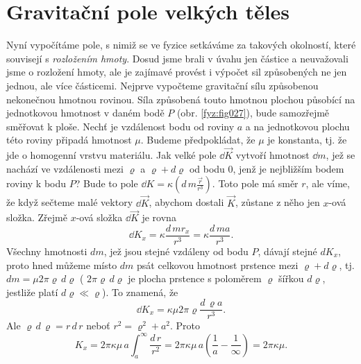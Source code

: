 {   
  \section{Gravitační pole velkých těles}
    Nyní vypočítáme pole, s nimiž se ve fyzice setkáváme za takových okolností, které souvisejí s 
    \emph{rozložením hmoty}. Dosud jsme brali v úvahu jen částice a neuvažovali jsme o rozložení 
    hmoty, ale je zajímavé provést i výpočet sil způsobených ne jen jednou, ale více částicemi. 
    Nejprve vypočteme gravitační sílu způsobenou nekonečnou hmotnou rovinou. Síla způsobená touto 
    hmotnou plochou působící na jednotkovou hmotnost v daném bodě \(P\) (obr. \ref{fyz:fig027}), 
    bude samozřejmě směřovat k ploše. Nechť je vzdálenost bodu od roviny \(a\) a na jednotkovou 
    plochu této roviny připadá hmotnost \(\mu\). Budeme předpokládat, že \(\mu\) je konstanta, tj. 
    že jde o homogenní vrstvu materiálu. Jak velké pole \(\dd{\vec{K}}\) vytvoří hmotnost 
    \(\dd{m}\), jež se nachází ve vzdálenosti mezi \(\varrho\) a \(\varrho +d\varrho\) od bodu 
    \(0\), jenž je nejbližším bodem roviny k bodu \(P\)? Bude to pole \(\dd{K} = 
    \kappa(d\,m\frac{\vec{r}}{r^3})\). Toto pole má směr \(r\), ale víme, že když sečteme malé 
    vektory \(\dd{\vec{K}}\), abychom dostali \(\vec{K}\), zůstane z něho jen \(x\)-ová složka. 
    Zřejmě \(x\)-ová složka \(\dd{\vec{K}}\) je rovna
    \begin{equation}\label{FYZ:eq046}
      \dd{K_x} = \kappa\frac{d\,mr_x}{r^3} = \kappa\frac{d\,ma}{r^3}.
    \end{equation}
    Všechny hmotnosti \(dm\), jež jsou stejné vzdáleny od bodu \(P\), dávají stejné \(dK_x\), proto 
    hned můžeme místo \(dm\) psát celkovou hmotnost prstence mezi \(\varrho +d\varrho\), tj. 
    \(dm=\mu2\pi\varrho\,d\varrho\) ( \(2\pi\varrho\,d\varrho\) je plocha prstence s poloměrem 
    \(\varrho\) šířkou \(d\varrho\), jestliže platí \(d\varrho \ll \varrho\)). To znamená, že
    \begin{equation}\label{FYZ:eq047}
      \dd{K_x} = \kappa\mu2\pi\varrho\frac{d\,\varrho a}{r^3}.
    \end{equation}
    Ale \(\varrho\,d\,\varrho = r\,d\,r\) neboť \(r^2 = \varrho^2 + a^2\). Proto
    \begin{equation}\label{FYZ:eq048}
      K_x = 2\pi\kappa\mu\,a\int_a^\infty\frac{d\,r}{r^2}
          = 2\pi\kappa\mu\,a\left(\frac{1}{a} - \frac{1}{\infty}\right) = 2\pi\kappa\mu.
    \end{equation}

}
